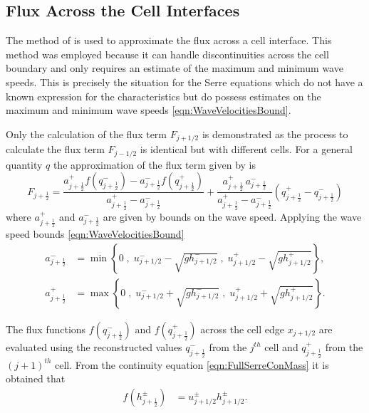 \subsection{Flux Across the Cell Interfaces}

The method of \citet{Kurganov-etal-2001-707} is used to approximate the flux across a cell interface. This method was employed because it can handle discontinuities across the cell boundary and only requires an estimate of the maximum and minimum wave speeds. This is precisely the situation for the Serre equations which do not have a known expression for the characteristics but do possess estimates on the maximum and minimum wave speeds \eqref{eqn:WaveVelocitiesBound}.

Only the calculation of the flux term $F_{j+1/2}$ is demonstrated as the process to calculate the flux term $F_{j-1/2}$ is identical but with different cells. For a general quantity $q$ the approximation of the flux term given by \citet{Kurganov-etal-2001-707} is
\begin{equation}\label{eqn:HLL_flux}
F_{j+\frac{1}{2}} = \dfrac{a^+_{j+\frac{1}{2}} f\left(q^-_{j+\frac{1}{2}}\right) - a^-_{j+\frac{1}{2}} f\left(q^+_{j+\frac{1}{2}}\right)}{a^+_{j+\frac{1}{2}} - a^-_{j+\frac{1}{2}}}  + \dfrac{a^+_{j+\frac{1}{2}} \, a^-_{j+\frac{1}{2}}}{a^+_{j+\frac{1}{2}} - a^-_{j+\frac{1}{2}}} \left(  q^+_{j+\frac{1}{2}} - q^-_{j+\frac{1}{2}} \right)
\end{equation}
where $a^+_{j+\frac{1}{2}}$ and $a^-_{j+\frac{1}{2}}$ are given by bounds on the wave speed. Applying the wave speed bounds \eqref{eqn:WaveVelocitiesBound}
\begin{align}
a^-_{j+\frac{1}{2}} &= \min\left\lbrace 0\;,\;  u^-_{j + 1/2} - \sqrt{g h^-_{j + 1/2}}  \;,\;u^+_{j + 1/2} - \sqrt{g h^+_{j + 1/2}} \right\rbrace  ,\\
a^+_{j+\frac{1}{2}} &= \max\left\lbrace 0 \;,\;  u^-_{j + 1/2} + \sqrt{g h^-_{j + 1/2}}  \;,\;u^+_{j + 1/2} + \sqrt{g h^+_{j + 1/2}} \right\rbrace .
\label{eqn:WaveSpeedBoundsFluxApprox}
\end{align}

The flux functions $f(q^-_{j+\frac{1}{2}})$ and $f(q^+_{j+\frac{1}{2}})$ across the cell edge $x_{j+1/2}$ are evaluated using the reconstructed values $q^-_{j+\frac{1}{2}}$ from the $j^{th}$ cell and $q^+_{j+\frac{1}{2}}$ from the $(j+1)^{th}$ cell. From the continuity equation \eqref{eqn:FullSerreConMass} it is obtained that
\begin{align*}
f\left(h^\pm_{j+\frac{1}{2}}\right) &= u^\pm_{j + 1/2}  h^\pm_{j + 1/2}.
\end{align*}

